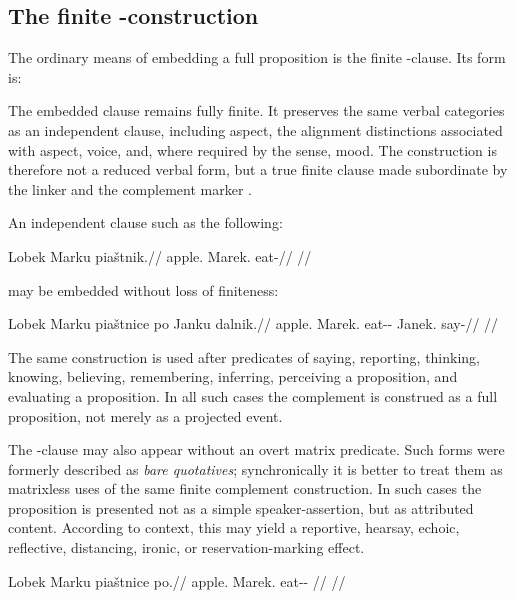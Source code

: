 \subsection{The finite -construction}

The ordinary means of embedding a full proposition is the finite
-clause. Its form is:

\begin{center}
\end{center}

The embedded clause remains fully finite. It preserves the same verbal
categories as an independent clause, including aspect, the alignment
distinctions associated with aspect, voice, and, where required by the sense,
mood. The construction is therefore not a reduced verbal form, but a true
finite clause made subordinate by the linker  and the complement
marker .

An independent clause such as the following:

\ex
\begingl
\gla Lobek Marku piaštnik.//
\glb apple.\Dir{} Marek.\Trs{} eat-\Pf{}//
\glft {}//
\endgl
\xe

may be embedded without loss of finiteness:

\ex
\begingl
\gla Lobek Marku piaštnice po Janku dalnik.//
\glb apple.\Dir{} Marek.\Trs{} eat-\Pf{}-\Lnk{} \Compl{} Janek.\Trs{} say-\Pf{}//
\glft {}//
\endgl
\xe

The same construction is used after predicates of saying, reporting,
thinking, knowing, believing, remembering, inferring, perceiving a
proposition, and evaluating a proposition. In all such cases the complement
is construed as a full proposition, not merely as a projected event.

The -clause may also appear without an overt matrix predicate. Such
forms were formerly described as \textit{bare quotatives}; synchronically it
is better to treat them as matrixless uses of the same finite complement
construction. In such cases the proposition is presented not as a simple
speaker-assertion, but as attributed content. According to context, this may
yield a reportive, hearsay, echoic, reflective, distancing, ironic, or
reservation-marking effect.

\ex
\begingl
\gla Lobek Marku piaštnice po.//
\glb apple.\Dir{} Marek.\Trs{} eat-\Pf{}-\Lnk{} \Compl{}//
\glft {}//
\endgl
\xe

